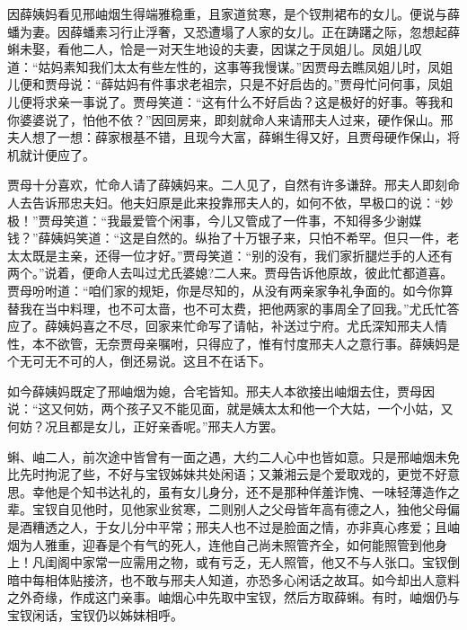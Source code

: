 \documentclass[12pt,oneside]{book}
\begin{document}
因薛姨妈看见邢岫烟生得端雅稳重，且家道贫寒，是个钗荆裙布的女儿。便说与薛蟠为妻。因薛蟠素习行止浮奢，又恐遭塌了人家的女儿。正在踌躇之际，忽想起薛蝌未娶，看他二人，恰是一对天生地设的夫妻，因谋之于凤姐儿。凤姐儿叹道：“姑妈素知我们太太有些左性的，这事等我慢谋。”因贾母去瞧凤姐儿时，凤姐儿便和贾母说：“薛姑妈有件事求老祖宗，只是不好启齿的。”贾母忙问何事，凤姐儿便将求亲一事说了。贾母笑道：“这有什么不好启齿？这是极好的好事。等我和你婆婆说了，怕他不依？”因回房来，即刻就命人来请邢夫人过来，硬作保山。邢夫人想了一想：薛家根基不错，且现今大富，薛蝌生得又好，且贾母硬作保山，将机就计便应了。

贾母十分喜欢，忙命人请了薛姨妈来。二人见了，自然有许多谦辞。邢夫人即刻命人去告诉邢忠夫妇。他夫妇原是此来投靠邢夫人的，如何不依，早极口的说：“妙极！”贾母笑道：“我最爱管个闲事，今儿又管成了一件事，不知得多少谢媒钱？”薛姨妈笑道：“这是自然的。纵抬了十万银子来，只怕不希罕。但只一件，老太太既是主亲，还得一位才好。”贾母笑道：“别的没有，我们家折腿烂手的人还有两个。”说着，便命人去叫过尤氏婆媳?二人来。贾母告诉他原故，彼此忙都道喜。贾母吩咐道：“咱们家的规矩，你是尽知的，从没有两亲家争礼争面的。如今你算替我在当中料理，也不可太啬，也不可太费，把他两家的事周全了回我。”尤氏忙答应了。薛姨妈喜之不尽，回家来忙命写了请帖，补送过宁府。尤氏深知邢夫人情性，本不欲管，无奈贾母亲嘱咐，只得应了，惟有忖度邢夫人之意行事。薛姨妈是个无可无不可的人，倒还易说。这且不在话下。

如今薛姨妈既定了邢岫烟为媳，合宅皆知。邢夫人本欲接出岫烟去住，贾母因说：“这又何妨，两个孩子又不能见面，就是姨太太和他一个大姑，一个小姑，又何妨？况且都是女儿，正好亲香呢。”邢夫人方罢。

蝌、岫二人，前次途中皆曾有一面之遇，大约二人心中也皆如意。只是邢岫烟未免比先时拘泥了些，不好与宝钗姊妹共处闲语；又兼湘云是个爱取戏的，更觉不好意思。幸他是个知书达礼的，虽有女儿身分，还不是那种佯羞诈愧、一味轻薄造作之辈。宝钗自见他时，见他家业贫寒，二则别人之父母皆年高有德之人，独他父母偏是酒糟透之人，于女儿分中平常；邢夫人也不过是脸面之情，亦非真心疼爱；且岫烟为人雅重，迎春是个有气的死人，连他自己尚未照管齐全，如何能照管到他身上！凡闺阁中家常一应需用之物，或有亏乏，无人照管，他又不与人张口。宝钗倒暗中每相体贴接济，也不敢与邢夫人知道，亦恐多心闲话之故耳。如今却出人意料之外奇缘，作成这门亲事。岫烟心中先取中宝钗，然后方取薛蝌。有时，岫烟仍与宝钗闲话，宝钗仍以姊妹相呼。
\end{document}

